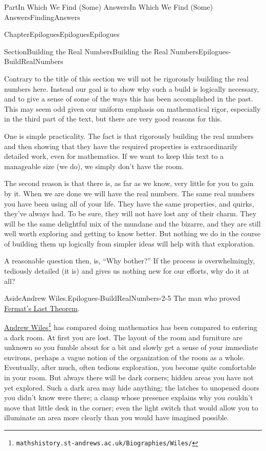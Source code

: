 \documentclass[oneside,10pt,]{book}
\numberwithin{equation}{part}
\begin{document}
\begin{partptx}{Part}{In Which We Find (Some) Answers}{}{In Which We Find (Some) Answers}{}{}{FindingAnswers}
\begin{chapterptx}{Chapter}{Epilogues}{}{Epilogues}{}{}{Epilogues}
\begin{sectionptx}{Section}{Building the Real Numbers}{}{Building the Real Numbers}{}{}{Epilogues-BuildRealNumbers}
\begin{introduction}{}%
Contrary to the title of this section we will not be rigorously building the real numbers here.  Instead our goal is to show why such a build is logically necessary, and to give a sense of some of the ways this has been accomplished in the past.  This may seem odd given our uniform emphasis on mathematical rigor, especially in the third part of the text, but there are very good reasons for this.%
\par
One is simple practicality.  The fact is that rigorously building the real numbers and then showing that they have the required properties is extraordinarily detailed work, even for mathematics.  If we want to keep this text to a manageable size (we do), we simply don't have the room.%
\par
The second reason is that there is, as far as we know, very little for you to gain by it.  When we are done we will have the real numbers.  The same real numbers you have been using all of your life.  They have the same properties, and quirks, they've always had.  To be sure, they will not have lost any of their charm. They will be the same delightful mix of the mundane and the bizarre, and they are still well worth exploring and getting to know better.  But nothing we do in the course of building them up logically from simpler ideas will help with that exploration.%
\par
A reasonable question then, is, ``Why bother?'' If the process is overwhelmingly, tediously detailed (it is) and gives us nothing new for our efforts, why do it at all?%
\begin{aside}{Aside}{Andrew Wiles.}{Epilogues-BuildRealNumbers-2-5}%
The man who proved \href{https://mathshistory.st-andrews.ac.uk/HistTopics/Fermat's_last_theorem/}{Fermat's Last Theorem}\footnotemark{}.%
\end{aside}
%
\href{https://mathshistory.st-andrews.ac.uk/Biographies/Wiles/}{Andrew Wiles}\footnote{\nolinkurl{mathshistory.st-andrews.ac.uk/Biographies/Wiles/}\label{Epilogues-BuildRealNumbers-2-6-2}} has compared doing mathematics has been compared to entering a dark room. At first you are lost.  The layout of the room and furniture are unknown so you fumble about for a bit and slowly get a sense of your immediate environs, perhaps a vague notion of the organization of the room as a whole.  Eventually, after much, often tedious exploration, you become quite comfortable in your room.  But always there will be dark corners; hidden areas you have not yet explored.  Such a dark area may hide anything; the latches to unopened doors you didn't know were there; a clamp whose presence explains why you couldn't move that little desk in the corner; even the light switch that would allow you to illuminate an area more clearly than you would have imagined possible.%

\end{introduction}
\end{sectionptx}
\end{chapterptx}
\end{partptx}
\end{document}

